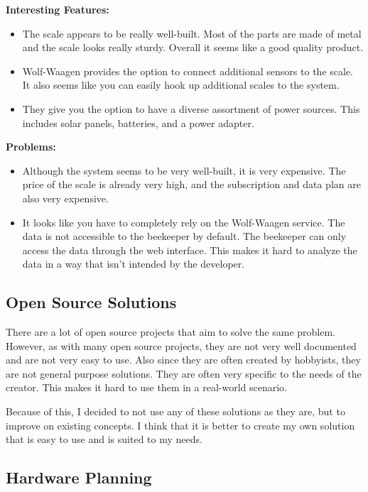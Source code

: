 \newpage
\textbf{Interesting Features:}
\begin{itemize}
    \item The scale appears to be really well-built. Most of the parts are made of metal and the scale looks really sturdy. Overall it seems like a good quality product. 
    \item Wolf-Waagen provides the option to connect additional sensors to the scale. It also seems like you can easily hook up additional scales to the system.
    \item They give you the option to have a diverse assortment of power sources. This includes solar panels, batteries, and a power adapter.
\end{itemize}
\textbf{Problems:}
\begin{itemize}
    \item Although the system seems to be very well-built, it is very expensive. The price of the scale is already very high, and the subscription and data plan are also very expensive.
    \item It looks like you have to completely rely on the Wolf-Waagen service. The data is not accessible to the beekeeper by default. The beekeeper can only access the data through the web interface. This makes it hard to analyze the data in a way that isn't intended by the developer.
\end{itemize}

\newpage

\subsection{Open Source Solutions}

There are a lot of open source projects that aim to solve the same problem. However, as with many open source projects, they are not very well documented and are not very easy to use. Also since they are often created by hobbyists, they are not general purpose solutions. They are often very specific to the needs of the creator. This makes it hard to use them in a real-world scenario.

Because of this, I decided to not use any of these solutions as they are, but to improve on existing concepts. I think that it is better to create my own solution that is easy to use and is suited to my needs.

\newpage

\subsection{Hardware Planning}
